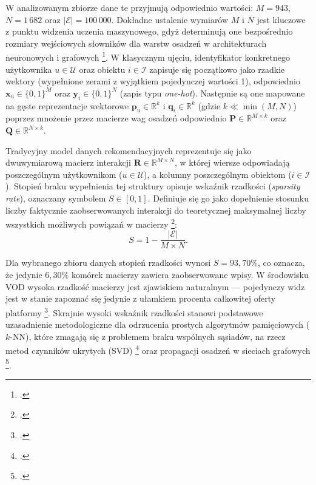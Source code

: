 W analizowanym zbiorze dane te przyjmują odpowiednio wartości: $M = 943$, $N = 1\,682$ oraz $|\mathcal{E}| = 100\,000$. Dokładne ustalenie wymiarów $M$ i $N$ jest kluczowe z punktu widzenia uczenia maszynowego, gdyż determinują one bezpośrednio rozmiary wejściowych słowników dla warstw osadzeń w architekturach neuronowych i grafowych \footcite[sekcje 2.1, 3.2 oraz 3.4]{zhangDeepLearningBased2020}. W klasycznym ujęciu, identyfikator konkretnego użytkownika $u \in \mathcal{U}$ oraz obiektu $i \in \mathcal{I}$ zapisuje się początkowo jako rzadkie wektory (wypełnione zerami z wyjątkiem pojedynczej wartości 1), odpowiednio $\mathbf{x}_u \in \{0, 1\}^M$ oraz $\mathbf{y}_i \in \{0, 1\}^N$ (zapis typu \foreignlanguage{english}{\textit{one-hot}}). Następnie są one mapowane na gęste reprezentacje wektorowe $\mathbf{p}_u \in \mathbb{R}^k$ i $\mathbf{q}_i \in \mathbb{R}^k$ (gdzie $k \ll \min(M, N)$) poprzez mnożenie przez macierze wag osadzeń odpowiednio $\mathbf{P} \in \mathbb{R}^{M \times k}$ oraz $\mathbf{Q} \in \mathbb{R}^{N \times k}$.

Tradycyjny model danych rekomendacyjnych reprezentuje się jako dwuwymiarową macierz interakcji $\mathbf{R} \in \mathbb{R}^{M \times N}$, w której wiersze odpowiadają poszczególnym użytkownikom ($u \in \mathcal{U}$), a kolumny poszczególnym obiektom ($i \in \mathcal{I}$). Stopień braku wypełnienia tej struktury opisuje wskaźnik rzadkości (\foreignlanguage{english}{\textit{sparsity rate}}), oznaczany symbolem $S \in [0, 1]$. Definiuje się go jako dopełnienie stosunku liczby faktycznie zaobserwowanych interakcji do teoretycznej maksymalnej liczby wszystkich możliwych powiązań w macierzy \footcite{suSurveyCollaborativeFiltering2009}:
\begin{equation}
    S = 1 - \frac{|\mathcal{E}|}{M \times N}.
\end{equation}

Dla wybranego zbioru danych stopień rzadkości wynosi $S = 93{,}70\%$, co oznacza, że jedynie $6{,}30\%$ komórek macierzy zawiera zaobserwowane wpisy. W środowisku VOD wysoka rzadkość macierzy jest zjawiskiem naturalnym --- pojedynczy widz jest w stanie zapoznać się jedynie z ułamkiem procenta całkowitej oferty platformy \footcite[19, 23]{checinskiSystemyRekomendacjiRemedium2023}. Skrajnie wysoki wskaźnik rzadkości stanowi podstawowe uzasadnienie metodologiczne dla odrzucenia prostych algorytmów pamięciowych ($k$-NN), które zmagają się z problemem braku wspólnych sąsiadów, na rzecz metod czynników ukrytych (SVD) \footcite{ korenMatrixFactorizationTechniques2009} oraz propagacji osadzeń w sieciach grafowych \footcite{zhangDeepLearningBased2020}.

